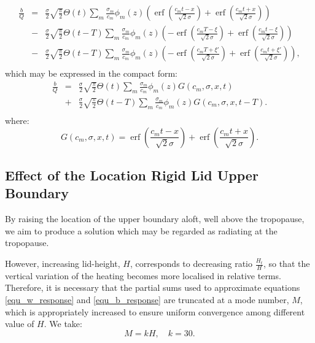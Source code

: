 \documentclass[a4paper,10pt]{article}
\DeclareMathOperator\erf {erf}
\newcommand{\heavi}{\Theta}
\begin{document}
\begin{eqnarray}
\frac{b}{Q} & = & \frac{\sigma}{2} \sqrt{\frac{\pi}{2}} \heavi( t)    \sum_m  \frac{\sigma_m}{c_m} \phi_m(z)  \left(     \erf \left( \frac{c_mt-x}{\sqrt{2} \sigma}\right) + \erf \left( \frac{c_mt+x}{\sqrt{2} \sigma}\right) \right)  \\ \nonumber            		                   & - & \frac{\sigma}{2} \sqrt{\frac{\pi}{2}}  \heavi( t-T) \sum_m  \frac{\sigma_m}{c_m} \phi_m(z)  \left( - \erf \left( \frac{c_m T - \xi }{\sqrt{2} \sigma}\right) +  \erf \left( \frac{c_mt-\xi}{\sqrt{2} \sigma}\right) \right)  \\  \nonumber                                		   & - & \frac{\sigma}{2} \sqrt{\frac{\pi}{2}}  \heavi( t-T) \sum_m  \frac{\sigma_m}{c_m} \phi_m(z)  \left( - \erf \left( \frac{c_m T + \xi' }{\sqrt{2} \sigma}\right) +  \erf \left( \frac{c_mt+\xi'}{\sqrt{2} \sigma}\right) \right), \\ \nonumber                  
\end{eqnarray}
%
which may be expressed in the compact form:
%
\begin{eqnarray}
\label{equ_b_response}
\frac{b}{Q} & = & \frac{\sigma}{2} \sqrt{\frac{\pi}{2}} \heavi( t)    \sum_m  \frac{\sigma_m}{c_m} \phi_m(z) G(c_m,\sigma,x,t)     \\ \nonumber
                   & + & \frac{\sigma}{2} \sqrt{\frac{\pi}{2}}  \heavi( t-T) \sum_m  \frac{\sigma_m}{c_m} \phi_m(z) G(c_m,\sigma,x,t-T). \\ \nonumber                  
\end{eqnarray}
%
where:
%
\begin{equation}
G(c_m,\sigma,x,t) = \erf \left( \frac{c_m t - x}{ \sqrt{2} \sigma } \right) +  \erf \left( \frac{c_m t + x}{ \sqrt{2} \sigma } \right).
\end{equation}
%
%
%
\subsection{Effect of the Location Rigid Lid Upper Boundary}
\label{sec_lid_height}
%
By raising the location of the upper boundary aloft, well above the tropopause, we aim to 
produce a solution which may be regarded as radiating at the tropopause. 

However, increasing lid-height, $H$, corresponds to decreasing ratio $ \frac{H_t}{H}$, so that the 
vertical variation of the heating becomes more localised in relative terms. 
Therefore, it is necessary that the partial sums used to approximate equations \ref{equ_w_response} and 
\ref{equ_b_response} are truncated at a mode number, $M$, which is appropriately increased to
ensure uniform convergence among different value of $H$. We take:
%
\begin{equation}
M = k H, \quad k = 30.
\end{equation}
%
\end{document}
